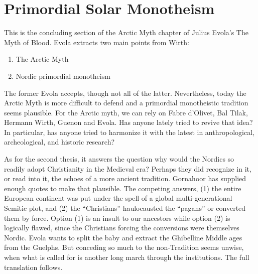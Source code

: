 \section{Primordial Solar Monotheism}

This is the concluding section of the Arctic Myth chapter of Julius Evola's The Myth of Blood. Evola extracts two main points from Wirth:

\begin{enumerate}
\item The Arctic Myth
\item Nordic primordial monotheism
\end{enumerate}

The former Evola accepts, though not all of the latter. Nevertheless, today the Arctic Myth is more difficult to defend and a primordial monotheistic tradition seems plausible. For the Arctic myth, we can rely on Fabre d'Olivet, Bal Tilak, Hermann Wirth, Guenon and Evola. Has anyone lately tried to revive that idea? In particular, has anyone tried to harmonize it with the latest in anthropological, archeological, and historic research?

As for the second thesis, it answers the question why would the Nordics so readily adopt Christianity in the Medieval era? Perhaps they did recognize in it, or read into it, the echoes of a more ancient tradition. Gornahoor has supplied enough quotes to make that plausible. The competing answers, (1) the entire European continent was put under the spell of a global multi-generational Semitic plot, and (2) the ``Christians'' haulocausted the ``pagans'' or converted them by force. Option (1) is an insult to our ancestors while option (2) is logically flawed, since the Christians forcing the conversions were themselves Nordic. Evola wants to split the baby and extract the Ghibelline Middle ages from the Guelphs. But conceding so much to the non-Tradition seems unwise, when what is called for is another long march through the institutions. The full translation follows.

